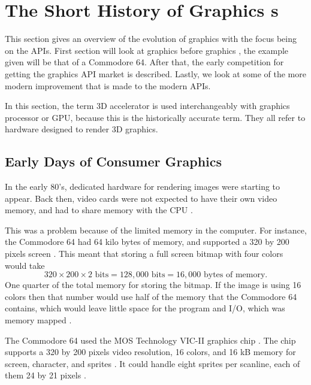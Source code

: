 \section{The Short History of Graphics s}\label{sec:short_history}
\begin{sectionmeta}
	This section gives an overview of the evolution of graphics with the focus being on the \glspl{API}.
	First section will look at graphics before graphics , the example given will be that of a Commodore 64.
	After that, the early competition for getting the graphics \gls{API} market is described.
	Lastly, we look at some of the more modern improvement that is made to the modern \glspl{API}.
	
	In this section, the term 3D accelerator is used interchangeably with graphics processor or \gls{GPU}, because this is the historically accurate term. 
	They all refer to hardware designed to render 3D graphics.
\end{sectionmeta}

\subsection{Early Days of Consumer Graphics}

In the early 80's, dedicated hardware for rendering images were starting to appear.
Back then, video cards were not expected to have their own video memory, and had to share memory with the \gls{CPU} \cite{wikipedia????shared}.

This was a problem because of the limited memory in the computer.
For instance, the Commodore 64 had 64 kilo bytes of memory, and supported a 320 by 200 pixels screen \cite{commodore1983commodore}.
This meant that storing a full screen bitmap with four colors would take $$320\times 200\times 2 \text{ bits} = 128,000 \text{ bits} = 16,000 \text{ bytes of memory.}$$
One quarter of the total memory for storing the bitmap.
If the image is using 16 colors then that number would use half of the memory that the Commodore 64 contains, which would leave little space for the program and I/O, which was memory mapped \cite{commodore1983commodore}.

The Commodore 64 used the MOS Technology VIC-II graphics chip \cite{commodore1983commodore}.
The chip supports a 320 by 200 pixels video resolution, 16 colors, and 16 kB memory for screen, character, and sprites \cite{commodore1983commodore}.
It could handle eight sprites per scanline, each of them 24 by 21 pixels \cite{commodore1983commodore}.

